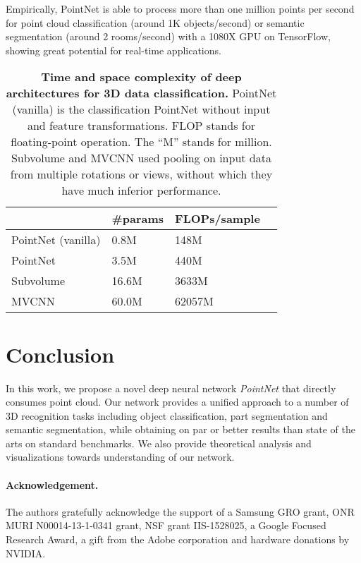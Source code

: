 \documentclass[10pt,twocolumn,letterpaper]{article}
\newcommand{\mypara}{\vspace*{-15pt}\paragraph}
\begin{document}
Empirically, PointNet is able to process more than one million points per second for point cloud classification (around 1K objects/second) or semantic segmentation (around 2 rooms/second) with a 1080X GPU on TensorFlow, showing great potential for real-time applications. 

\begin{table}[h!]
    \centering
    \begin{tabular}{|l|l|l|l|}
    \hline
    ~                & \#params & FLOPs/sample\\ \hline
    PointNet (vanilla)  & 0.8M                        & 148M \\
    PointNet         & 3.5M                         & 440M \\ \hline
Subvolume~\cite{qi2016volumetric} & 16.6M                        & 3633M \\ \hline
    MVCNN~\cite{su15mvcnn}   & 60.0M                          & 62057M \\ \hline
    \end{tabular}
    \caption{\textbf{Time and space complexity of deep architectures for 3D data classification.} PointNet (vanilla) is the classification PointNet without input and feature transformations. FLOP stands for floating-point operation.
The ``M'' stands for million. Subvolume and MVCNN used pooling on input data from multiple rotations or views, without which they have much inferior performance.}
    \label{pointnet_complexity}
    \vspace{-3mm}
\end{table} 
\section{Conclusion}
\label{sec:conclusion}
In this work, we propose a novel deep neural network \emph{PointNet} that directly consumes point cloud. Our network provides a unified approach to a number of 3D recognition tasks including object classification, part segmentation and semantic segmentation, while obtaining on par or better results than state of the arts on standard benchmarks. We also provide theoretical analysis and visualizations towards understanding of our network.

 
\mypara{Acknowledgement.} The authors gratefully acknowledge the support of a Samsung GRO grant, ONR MURI N00014-13-1-0341 grant, NSF grant IIS-1528025, a Google Focused Research Award, a gift from the Adobe corporation and hardware donations by NVIDIA. 
{\small


}
\end{document}
